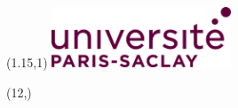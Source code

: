\label{cotutelle}








\begin{textblock}{1}(1.15,1)
\includegraphics[height=1.8cm]{Figures/Logos/UPSac.png} %
\label{Logo Paris Saclay}
\end{textblock}

\begin{textblock}{1}(12,\vpos)
\logoEt %
\label{Logo Etablissement}
\end{textblock}

